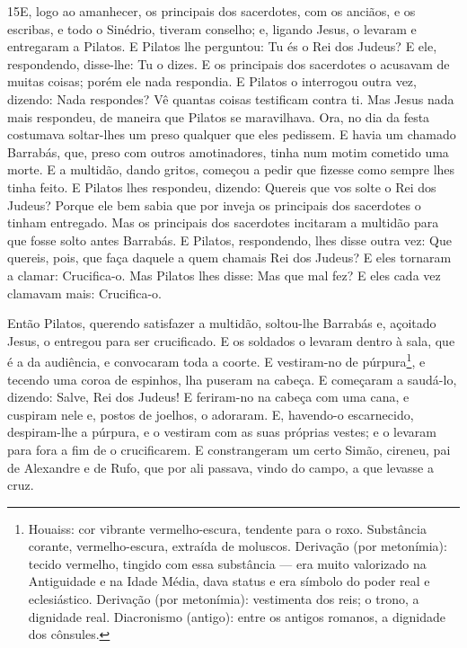 \medskip

\lettrine{15} E, logo ao amanhecer, os principais dos
sacerdotes, com os anciãos, e os escribas, e todo o Sinédrio,
tiveram conselho; e, ligando Jesus, o levaram e entregaram a
Pilatos. E Pilatos lhe perguntou: Tu és o Rei dos Judeus? E ele,
respondendo, disse-lhe: Tu o dizes. E os principais dos
sacerdotes o acusavam de muitas coisas; porém ele nada respondia.
E Pilatos o interrogou outra vez, dizendo: Nada respondes? Vê
quantas coisas testificam contra ti. Mas Jesus nada mais
respondeu, de maneira que Pilatos se maravilhava. Ora, no dia da
festa costumava soltar-lhes um preso qualquer que eles pedissem.
E havia um chamado Barrabás, que, preso com outros amotinadores,
tinha num motim cometido uma morte. E a multidão, dando gritos,
começou a pedir que fizesse como sempre lhes tinha feito. E
Pilatos lhes respondeu, dizendo: Quereis que vos solte o Rei dos
Judeus? Porque ele bem sabia que por inveja os principais dos
sacerdotes o tinham entregado. Mas os principais dos
sacerdotes incitaram a multidão para que fosse solto antes Barrabás.
E Pilatos, respondendo, lhes disse outra vez: Que quereis,
pois, que faça daquele a quem chamais Rei dos Judeus? E eles
tornaram a clamar: Crucifica-o. Mas Pilatos lhes disse: Mas
que mal fez? E eles cada vez clamavam mais: Crucifica-o.

Então Pilatos, querendo satisfazer a multidão, soltou-lhe
Barrabás e, açoitado Jesus, o entregou para ser crucificado.
E os soldados o levaram dentro à sala, que é a da audiência,
e convocaram toda a coorte. E vestiram-no de
púrpura\footnote{Houaiss: cor vibrante vermelho-escura, tendente
para o roxo. Substância corante, vermelho-escura, extraída de
moluscos. Derivação (por metonímia): tecido vermelho, tingido com
essa substância --- era muito valorizado na Antiguidade e na Idade
Média, dava status e era símbolo do poder real e eclesiástico.
Derivação (por metonímia): vestimenta dos reis; o trono, a dignidade
real. Diacronismo (antigo): entre os antigos romanos, a dignidade
dos cônsules.}, e tecendo uma coroa de espinhos, lha puseram na
cabeça. E começaram a saudá-lo, dizendo: Salve, Rei dos
Judeus! E feriram-no na cabeça com uma cana, e cuspiram nele
e, postos de joelhos, o adoraram. E, havendo-o escarnecido,
despiram-lhe a púrpura, e o vestiram com as suas próprias vestes; e
o levaram para fora a fim de o crucificarem. E constrangeram
um certo Simão, cireneu, pai de Alexandre e de Rufo, que por ali
passava, vindo do campo, a que levasse a cruz.

